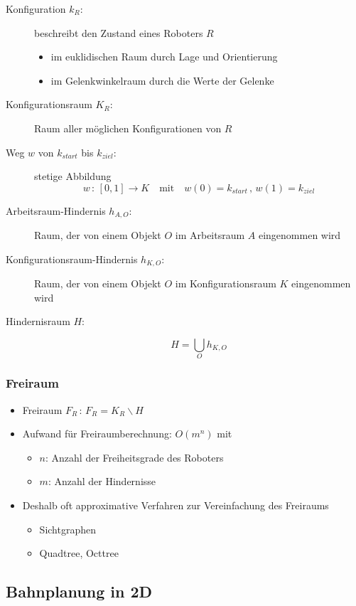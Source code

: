 \begin{description}
\item[Konfiguration $k_R$:] beschreibt den Zustand eines Roboters $R$
\begin{itemize}
\item im euklidischen Raum durch Lage und Orientierung
\item im Gelenkwinkelraum durch die Werte der Gelenke
\end{itemize}
\item[Konfigurationsraum $K_R$:] Raum aller möglichen Konfigurationen von $R$
\item[Weg $w$ von $k_{start}$ bis $k_{ziel}$:] stetige Abbildung $$w \, : \, [0,1] \to K \quad \textrm{mit} \quad w(0) = k_{start} \, , \, w(1) = k_{ziel}$$
\item[Arbeitsraum-Hindernis $h_{A,O}$:] Raum, der von einem Objekt $O$ im Arbeitsraum $A$ eingenommen wird
\item[Konfigurationsraum-Hindernis $h_{K,O}$:] Raum, der von einem Objekt $O$ im Konfigurationsraum $K$ eingenommen wird
\item[Hindernisraum $H$:] \quad $$H = \bigcup\limits_{O} h_{K,O}$$
\end{description}

\subsubsection*{Freiraum}

\begin{itemize}
\item Freiraum $F_R \, : \, F_R = K_R \backslash H$
\item Aufwand für Freiraumberechnung: $O(m^n)$ mit
\begin{itemize}
\item $n$: Anzahl der Freiheitsgrade des Roboters
\item $m$: Anzahl der Hindernisse
\end{itemize}
\item Deshalb oft approximative Verfahren zur Vereinfachung des Freiraums
\begin{itemize}
\item Sichtgraphen
\item Quadtree, Octtree
\end{itemize}
\end{itemize}

\subsection{Bahnplanung in 2D}

